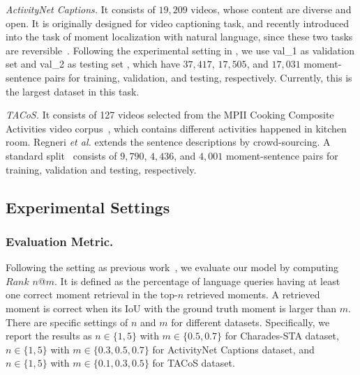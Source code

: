 \documentclass[letterpaper]{article} %
\begin{document}
\textit{ActivityNet Captions.} It consists of $19,209$  videos, whose content are diverse and open.
It is originally designed for video captioning task, and recently introduced into the task of moment localization with natural language, since these two tasks are reversible~\cite{chen2018temporally,zhang2019cross}.
Following the experimental setting in \cite{zhang2019cross}, we use val\_1 as validation set and val\_2 as testing set , which have $37,417$, $17,505$, and $17,031$ moment-sentence pairs for training, validation, and testing, respectively. Currently, this is the largest dataset in this task.

\textit{TACoS.}
It consists of 127 videos selected from the MPII Cooking Composite Activities video corpus~\cite{rohrbach2012script}, which contains different activities happened in kitchen room.
Regneri \textit{et al.} extends the sentence descriptions by crowd-sourcing.
A standard split~\cite{gao2017tall} consists of $9,790$, $4,436$, and $4,001$ moment-sentence pairs for training, validation and testing, respectively.

\subsection{Experimental Settings}

\subsubsection{Evaluation Metric.}
Following the setting as previous work~\cite{gao2017tall}, we evaluate our model by computing $Rank$ $n$@$m$. It is defined as the percentage of language queries having at least one correct moment retrieval in the top-$n$ retrieved moments. A retrieved moment is correct when its IoU with the ground truth moment is larger than $m$.
There are specific settings of $n$ and $m$ for different datasets. Specifically,
we report the results as $n\in\{1, 5\}$ with $m\in\{0.5,0.7\}$ for Charades-STA dataset, $n\in\{1, 5\}$ with $m\in\{0.3,0.5,0.7\}$ for ActivityNet Captions dataset, and $n\in\{1, 5\}$ with $m\in\{0.1,0.3,0.5\}$ for TACoS dataset.
\end{document}
